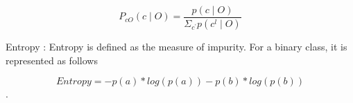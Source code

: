 \documentclass[conference]{IEEEtran}
\begin{document}
\[P_{cO}(c \mid O) = \frac{p(c \mid O)}{\Sigma _{c^{'} } p(c^{l} \mid O )  }\]


Entropy : Entropy is defined as the measure of impurity. For a binary class, it is represented as follows

\[Entropy = - p(a) *log(p(a)) - p(b)*log(p(b))\].






%
%



%
\end{document}
